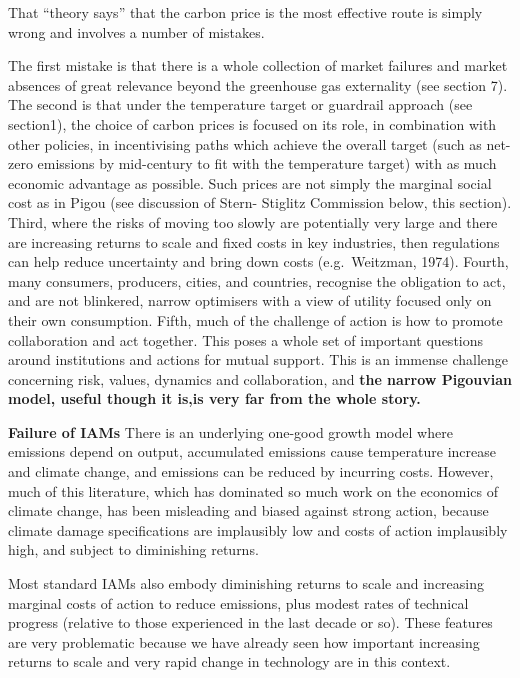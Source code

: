 \documentclass[
]{book}
\begin{document}
That ``theory says'' that the carbon price is the most effective route is simply wrong
and involves a number of mistakes.

The first mistake is that there is a whole collection of market failures and market absences of great
relevance beyond the greenhouse gas externality (see section 7). The second is that under the
temperature target or guardrail approach (see section1), the choice of carbon prices is focused on its
role, in combination with other policies, in incentivising paths which achieve the overall target (such as
net-zero emissions by mid-century to fit with the temperature target) with as much economic advantage
as possible. Such prices are not simply the marginal social cost as in Pigou (see discussion of Stern-
Stiglitz Commission below, this section). Third, where the risks of moving too slowly are potentially very
large and there are increasing returns to scale and fixed costs in key industries, then regulations can
help reduce uncertainty and bring down costs (e.g.~Weitzman, 1974). Fourth, many consumers,
producers, cities, and countries, recognise the obligation to act, and are not blinkered, narrow optimisers
with a view of utility focused only on their own consumption. Fifth, much of the challenge of action is
how to promote collaboration and act together. This poses a whole set of important questions around
institutions and actions for mutual support. This is an immense challenge concerning risk, values,
dynamics and collaboration, and \textbf{the narrow Pigouvian model, useful though it is,is very far from the whole story.}

\textbf{Failure of IAMs}
There is an underlying
one-good growth model where emissions depend on output, accumulated emissions cause temperature
increase and climate change, and emissions can be reduced by incurring costs. However, much of this
literature, which has dominated so much work on the economics of climate change, has been
misleading and biased against strong action, because climate damage specifications are implausibly
low and costs of action implausibly high, and subject to diminishing returns.

Most standard IAMs also embody diminishing returns to scale and increasing marginal costs of action
to reduce emissions, plus modest rates of technical progress (relative to those experienced in the last
decade or so). These features are very problematic because we have already seen how important
increasing returns to scale and very rapid change in technology are in this context.
\end{document}
